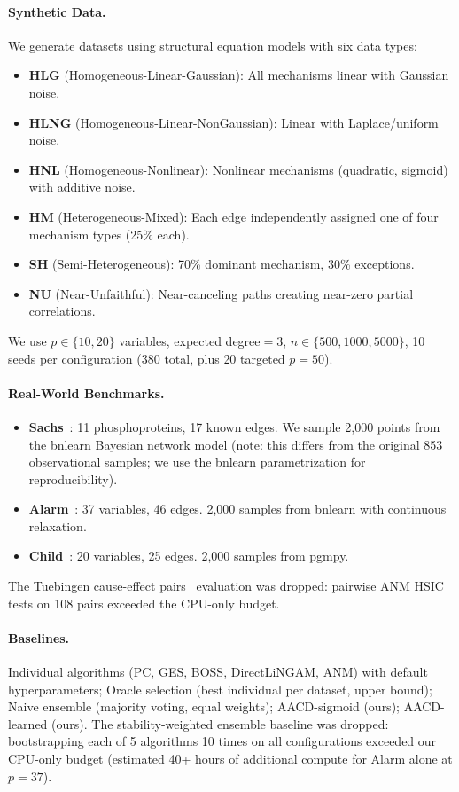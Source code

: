 \documentclass{article}
\newcommand{\aacd}{\textsc{AACD}}
\begin{document}
\paragraph{Synthetic Data.} We generate datasets using structural equation models with six data types:
\begin{itemize}
    \item \textbf{HLG} (Homogeneous-Linear-Gaussian): All mechanisms linear with Gaussian noise.
    \item \textbf{HLNG} (Homogeneous-Linear-NonGaussian): Linear with Laplace/uniform noise.
    \item \textbf{HNL} (Homogeneous-Nonlinear): Nonlinear mechanisms (quadratic, sigmoid) with additive noise.
    \item \textbf{HM} (Heterogeneous-Mixed): Each edge independently assigned one of four mechanism types (25\% each).
    \item \textbf{SH} (Semi-Heterogeneous): 70\% dominant mechanism, 30\% exceptions.
    \item \textbf{NU} (Near-Unfaithful): Near-canceling paths creating near-zero partial correlations.
\end{itemize}
We use $p \in \{10, 20\}$ variables, expected degree$=3$, $n \in \{500, 1000, 5000\}$, 10 seeds per configuration (380 total, plus 20 targeted $p{=}50$).

\paragraph{Real-World Benchmarks.}
\begin{itemize}
    \item \textbf{Sachs}~\citep{sachs2005causal}: 11 phosphoproteins, 17 known edges. We sample 2{,}000 points from the bnlearn Bayesian network model (note: this differs from the original 853 observational samples; we use the bnlearn parametrization for reproducibility).
    \item \textbf{Alarm}~\citep{beinlich1989alarm}: 37 variables, 46 edges. 2{,}000 samples from bnlearn with continuous relaxation.
    \item \textbf{Child}~\citep{spiegelhalter1993bayesian}: 20 variables, 25 edges. 2{,}000 samples from pgmpy.
\end{itemize}
The Tuebingen cause-effect pairs~\citep{mooij2016distinguishing} evaluation was dropped: pairwise ANM HSIC tests on 108 pairs exceeded the CPU-only budget.

\paragraph{Baselines.} Individual algorithms (PC, GES, BOSS, DirectLiNGAM, ANM) with default hyperparameters; Oracle selection (best individual per dataset, upper bound); Naive ensemble (majority voting, equal weights); \aacd{}-sigmoid (ours); \aacd{}-learned (ours). The stability-weighted ensemble baseline was dropped: bootstrapping each of 5 algorithms 10 times on all configurations exceeded our CPU-only budget (estimated 40+ hours of additional compute for Alarm alone at $p{=}37$).
\end{document}
